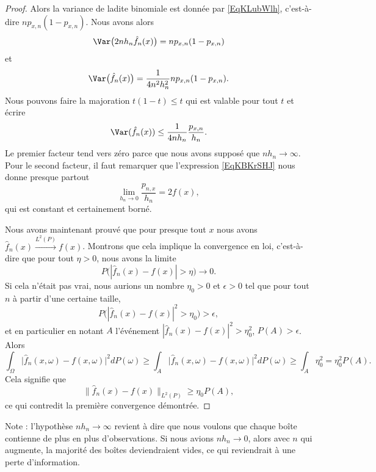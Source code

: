 \begin{proof}
	Alors la variance de ladite binomiale est donnée par \eqref{EqKLubWlh}, c'est-à-dire \( np_{x,n}(1-p_{x,n})\). Nous avons alors
	\begin{equation}
		\Var\big( 2nh_n\hat f_n(x) \big)=np_{x,n}(1-p_{x,n})
	\end{equation}
	et
	\begin{equation}
		\Var\big( \hat f_n(x) \big)=\frac{1}{ 4n^2h_n^2 }np_{x,n}(1-p_{x,n}).
	\end{equation}
	Nous pouvons faire la majoration \( t(1-t)\leq t\) qui est valable pour tout \( t\) et écrire
	\begin{equation}
		\Var(\hat f_n(x))\leq \frac{1}{ 4nh_n }\frac{ p_{x,n} }{ h_n }.
	\end{equation}
	Le premier facteur tend vers zéro parce que nous avons supposé que \( nh_n\to \infty\). Pour le second facteur, il faut remarquer que l'expression \eqref{EqKBKrSHJ} nous donne presque partout
	\begin{equation}
		\lim_{h_n\to 0} \frac{ p_{n,x} }{ h_n }=2f(x),
	\end{equation}
	qui est constant et certainement borné.

	Nous avons maintenant prouvé que pour presque tout \( x\) nous avons \( \hat f_n(x)\stackrel{L^2(P)}{\to}f(x)\). Montrons que cela implique la convergence en loi, c'est-à-dire que pour tout \( \eta>0\), nous avons la limite
	\begin{equation}
		P\big( | \hat f_n(x)-f(x) |>\eta \big)\to 0.
	\end{equation}
	Si cela n'était pas vrai, nous aurions un nombre \( \eta_0>0\) et \( \epsilon>0\) tel que pour tout \( n\) à partir d'une certaine taille,
	\begin{equation}
		P\Big( | \hat f_n(x)-f(x) |^2>\eta_0 \Big)>\epsilon,
	\end{equation}
	et en particulier en notant \( A\) l'événement \( | \hat f_n(x)-f(x) |^2>\eta_0^2\), \( P(A)>\epsilon\). Alors
	\begin{equation}
		\int_{\Omega}\big| \hat f_n(x,\omega)-f(x,\omega) \big|^2dP(\omega)\geq \int_A\big| \hat f_n(x,\omega)-f(x,\omega) \big|^2dP(\omega)\geq\int_A\eta_0^2=\eta_0^2P(A).
	\end{equation}
	Cela signifie que
	\begin{equation}
		\| \hat f_n(x)-f(x) \|_{L^2(P)}\geq \eta_0P(A),
	\end{equation}
	ce qui contredit la première convergence démontrée.
\end{proof}
Note : l'hypothèse \( nh_n\to\infty\) revient à dire que nous voulons que chaque boîte contienne de plus en plus d'observations. Si nous avions \( nh_n\to 0\), alors avec \( n\) qui augmente, la majorité des boîtes deviendraient vides, ce qui reviendrait à une perte d'information.

